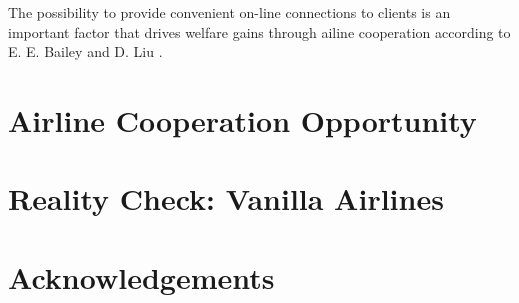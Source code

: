 \documentclass[twocolumn]{tum-article}
\begin{document}
The possibility to provide convenient on-line connections to clients is an important factor that drives welfare gains through ailine cooperation according to E. E. Bailey and D. Liu \cite{airline_consolidation_and_consumer_welfare}.
\section{Airline Cooperation Opportunity}


\section{Reality Check: Vanilla Airlines}


\section*{Acknowledgements}




\end{document}
